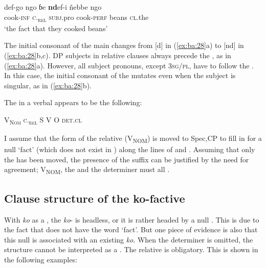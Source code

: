 \documentclass[output=paper,
modfonts
]{langscibook}
\begin{document}
\ex {}\settowidth\jamwidth{\currentjam}
\gll  def-go     ngo       ɓe           \textbf{nd}ef-i            ñebbe  ngo      \\
             cook-\textsc{inf}  \textsc{c.}\textsc{\textsubscript{rel}}    \textsc{subj.}pro  cook-\textsc{perf}     beans   \textsc{cl}.the\\\jambox{\currentjam}
\glt       ‘the fact that they cooked beans’
\z
\z

The initial consonant of the main   changes from [d] in (\ref{ex:ba:28}a) to [nd] in (\ref{ex:ba:28}b,c). DP subjects in relative clauses always precede the , as in (\ref{ex:ba:28}a). However, all subject pronouns, except 3\textsc{sg/pl}, have to follow the . In this case, the initial consonant of the  mutates even when the subject  is singular, as in (\ref{ex:ba:28}b).

The  in a verbal  appears to be the following:

\ea
   V\textsubscript{N}\textsc{\textsubscript{om}}   \hspace{1em}      \textsc{c.}\textsc{\textsubscript{rel}}    \hspace{1em}    S   \hspace{1em}       V    \hspace{1em}    O   \hspace{1em}      \textsc{det.cl}
\z

I assume that the  form of the relative  (V\textsubscript{NOM}) is moved to Spec,CP to fill in for a null  ‘fact’ (which does not exist in ) along the lines of  \citet{Collins1994} and \citet{TambaTorrence2013}. Assuming that only the   has been moved, the presence of the  suffix can be justified by the need for agreement; V\textsubscript{NOM}, the  and the determiner must all .
 
\subsection{Clause structure of the ko-factive} \label{sec:ba:4.3} 

With \textit{ko} as a , the \textit{ko}- is headless, or it is rather headed by a null . This is due to the fact that  does not have the word ‘fact’. But one piece of evidence is also that this null  is associated with an existing  \textit{ko}. When the determiner is omitted, the structure cannot be interpreted as a . The relative  is obligatory. This is shown in the following examples:
\end{document}
